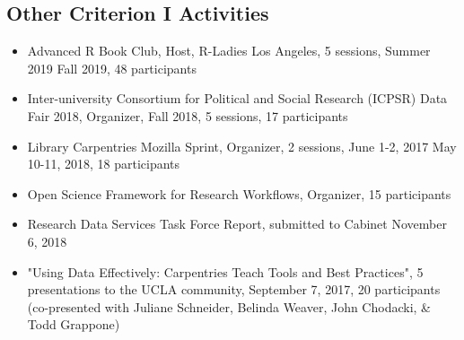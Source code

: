 \subsection{Other Criterion I Activities}
\begin{itemize}[label={},leftmargin=!,labelindent=5pt,itemindent=-15pt]
  \item Advanced R Book Club, Host, R-Ladies Los Angeles, 5 sessions, Summer 2019 \textbar Fall 2019,	48 participants
  \item Inter-university Consortium for Political and Social Research (ICPSR) Data Fair 2018, Organizer, Fall 2018, 5 sessions, 17 participants
  \item Library Carpentries Mozilla Sprint, Organizer, 2 sessions, June 1-2, 2017 \textbar May 10-11, 2018, 18 participants
  \item Open Science Framework for Research Workflows, Organizer, 15 participants
  \item Research Data Services Task Force Report, submitted to Cabinet November 6, 2018
  \item "Using Data Effectively: Carpentries Teach Tools and Best Practices", 5 presentations to the UCLA community, September 7, 2017,	20 participants (co-presented with Juliane Schneider, Belinda Weaver, John Chodacki, \& Todd Grappone)
\end{itemize}
